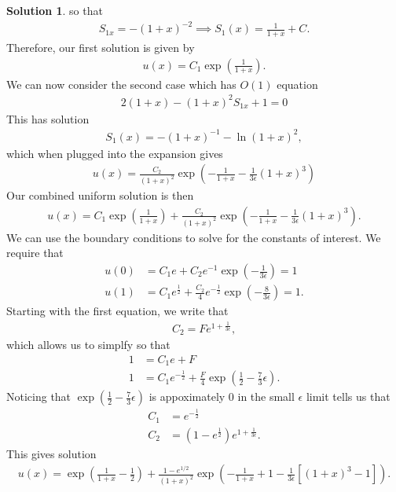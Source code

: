\documentclass[12pt]{article}
\theoremstyle{definition}
\newtheorem{sol}{Solution}
\theoremstyle{remark}
\begin{document}
\begin{sol}
so that
\begin{align*}
    S_{1x} = - (1 + x)^{-2} \implies S_{1}(x) = \frac{1}{1+x} + C.
\end{align*}
Therefore, our first solution is given by
\begin{align*}
    u(x) = C_{1}\exp\left( \frac{1}{1+x} \right).
\end{align*}
We can now consider the second case which has $O(1)$ equation
\begin{align*}
    2(1+x) - (1 + x)^{2} S_{1x} + 1 = 0
\end{align*}
This has solution
\begin{align*}
    S_{1}(x) = - (1 + x)^{-1} - \ln (1 + x)^{2},
\end{align*}
which when plugged into the expansion gives
\begin{align*}
    u(x) = \frac{C_{2}}{(1+x)^{2}}\exp\left( -\frac{1}{1+x} - \frac{1}{3\epsilon} (1+x)^{3}    \right)
\end{align*}
Our combined uniform solution is then
\begin{align*}
    u(x) = C_{1}\exp\left( \frac{1}{1 + x} \right) + \frac{C_{2}}{(1+x)^{2}}\exp\left( -\frac{1}{1+x} - \frac{1}{3\epsilon} (1+x)^{3} \right).
\end{align*}
We can use the boundary conditions to solve for the constants of interest. We require that
\begin{align*}
    u(0) &= C_{1} e + C_{2} e^{-1} \exp\left(-\frac{1}{3\epsilon}  \right) = 1\\
    u(1) &= C_{1} e^{\frac{1}{2}} + \frac{C_{2}}{4} e^{-\frac{1}{2}}\exp\left( - \frac{8}{3 \epsilon} \right) = 1.
\end{align*}
Starting with the first equation, we write that
\begin{align*}
C_{2} = F e^{1 + \frac{1}{3\epsilon}},
\end{align*}
which allows us to simplfy so that
\begin{align*}
    1  &= C_{1} e + F \\
    1 &= C_{1} e^{-\frac{1}{2}} + \frac{F}{4} \exp\left(\frac{1}{2} - \frac{7}{3} \epsilon\right).
\end{align*}
Noticing that $\exp\left(\frac{1}{2} - \frac{7}{3} \epsilon\right)$ is appoximately 0 in the small $\epsilon$ limit tells us that
 \begin{align*}
     C_{1} &= e^{-\frac{1}{2}} \\
     C_{2} &= (1 - e^{\frac{1}{2}})  e^{1 + \frac{1}{3\epsilon}}.
\end{align*}
This gives solution
\begin{align*}
    u(x) = \exp\left( \frac{1}{1 + x} - \frac{1}{2} \right) 
    + \frac{1 - e^{1 / 2}}{(1+x)^{2}} \exp\left( -\frac{1}{1+x} + 1 - \frac{1}{3\epsilon} \left[(1+x)^{3} - 1 \right] \right).
\end{align*}


\end{sol}
\end{document}
